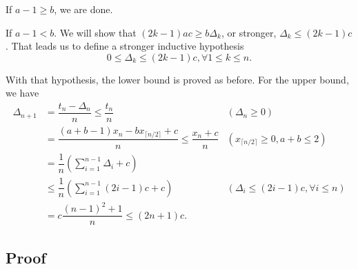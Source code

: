 If $a-1\ge b$, we are done.

If $a-1 < b$. We will show that $(2k-1)ac \ge b\Delta_k$, or stronger, $\Delta_k \le (2k-1)c$. That leads us to define a stronger inductive hypothesis
$$0 \le \Delta_k \le (2k-1)c, \forall 1\le k\le n.$$

With that hypothesis, the lower bound is proved as before. For the upper bound, we have
\begin{align*}
  \Delta_{n+1}
   & =  \dfrac{t_n-\Delta_n}{n} \le \dfrac{t_n}  {n}                                       & (\Delta_n\ge0)                         \\
   & = \dfrac{(a+b-1)x_n - b x_{\lceil n/2\rceil} + c}{n}             \le \dfrac{x_n+c}{n} & (x_{\lceil n/2\rceil}\ge0, a+b\le 2)   \\
   & = \dfrac{1}{n}\left(\sum_{i=1}^{n-1} \Delta_i + c\right)                                                                       \\
   & \le \dfrac{1}{n}\left(\sum_{i=1}^{n-1} (2i-1)c + c\right)                             & (\Delta_i \le (2i-1)c, \forall i\le n) \\
   & = c\dfrac{(n-1)^2 + 1}{n} \le (2n+1)c.
\end{align*}

\subsection{Proof}

